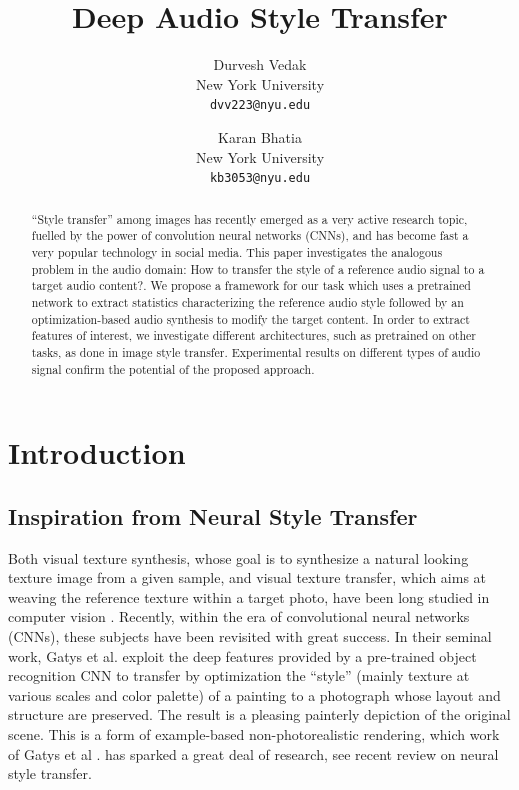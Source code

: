 \documentclass[10pt,twocolumn,letterpaper]{article}
\begin{document}
\title{Deep Audio Style Transfer}

\author{Durvesh Vedak\\
New York University\\
{\tt\small dvv223@nyu.edu}
\and
Karan Bhatia\\
New York University\\
{\tt\small kb3053@nyu.edu}
}


\maketitle

\begin{abstract}
“Style transfer” among images has recently emerged as a very
active research topic, fuelled by the power of convolution
neural networks (CNNs), and has become fast a very popular
technology in social media. This paper investigates the
analogous problem in the audio domain: How to transfer the
style of a reference audio signal to a target audio content?. We propose a framework for our task which uses a pretrained network to extract statistics characterizing the reference audio style followed by an optimization-based audio synthesis to modify the target content. In order to extract features of
interest, we investigate different architectures, such as pretrained
on other tasks, as done in image style transfer. Experimental
results on different types of audio signal confirm the potential
of the proposed approach.
\end{abstract}

\section{Introduction}

\subsection{Inspiration from Neural Style Transfer}
Both visual texture synthesis, whose goal is to synthesize a
natural looking texture image from a given sample, and visual
texture transfer, which aims at weaving the reference texture
within a target photo, have been long studied in computer
vision \cite{Authors00002}. Recently, within the era of convolutional neural
networks (CNNs), these subjects have been revisited with
great success. In their seminal work, Gatys et al. \cite{Authors00001} exploit
the deep features provided by a pre-trained object recognition
CNN to transfer by optimization the “style” (mainly texture
at various scales and color palette) of a painting to a photograph
whose layout and structure are preserved. The result is
a pleasing painterly depiction of the original scene. This is
a form of example-based non-photorealistic rendering, which work of Gatys et al \cite{Authors00001}. has sparked a great deal of research, see
recent review on neural style transfer.
\end{document}
